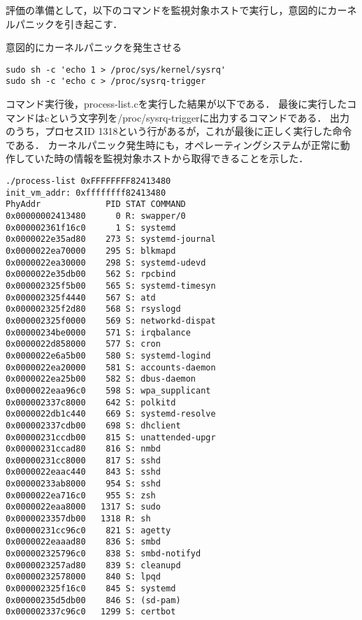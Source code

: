 評価の準備として，以下のコマンドを監視対象ホストで実行し，意図的にカーネルパニックを引き起こす．

\begin{itembox}[l]{意図的にカーネルパニックを発生させる}
    \begin{verbatim}
sudo sh -c 'echo 1 > /proc/sys/kernel/sysrq'
sudo sh -c 'echo c > /proc/sysrq-trigger
    \end{verbatim}
\end{itembox}

コマンド実行後，process-list.cを実行した結果が以下である．
最後に実行したコマンドはcという文字列を/proc/sysrq-triggerに出力するコマンドである．
出力のうち，プロセスID 1318という行があるが，これが最後に正しく実行した命令である．
カーネルパニック発生時にも，オペレーティングシステムが正常に動作していた時の情報を監視対象ホストから取得できることを示した．

\begin{itembox}[l]{1}
    \begin{verbatim}
./process-list 0xFFFFFFFF82413480
init_vm_addr: 0xffffffff82413480
PhyAddr             PID STAT COMMAND
0x00000002413480      0 R: swapper/0
0x000002361f16c0      1 S: systemd
0x0000022e35ad80    273 S: systemd-journal
0x0000022ea70000    295 S: blkmapd
0x0000022ea30000    298 S: systemd-udevd
0x0000022e35db00    562 S: rpcbind
0x000002325f5b00    565 S: systemd-timesyn
0x000002325f4440    567 S: atd
0x000002325f2d80    568 S: rsyslogd
0x000002325f0000    569 S: networkd-dispat
0x00000234be0000    571 S: irqbalance
0x0000022d858000    577 S: cron
0x0000022e6a5b00    580 S: systemd-logind
0x0000022ea20000    581 S: accounts-daemon
0x0000022ea25b00    582 S: dbus-daemon
0x0000022eaa96c0    598 S: wpa_supplicant
0x000002337c8000    642 S: polkitd
0x0000022db1c440    669 S: systemd-resolve
0x000002337cdb00    698 S: dhclient
0x00000231ccdb00    815 S: unattended-upgr
0x00000231ccad80    816 S: nmbd
0x00000231cc8000    817 S: sshd
0x0000022eaac440    843 S: sshd
0x00000233ab8000    954 S: sshd
0x0000022ea716c0    955 S: zsh
0x0000022eaa8000   1317 S: sudo
0x0000023357db00   1318 R: sh
0x00000231cc96c0    821 S: agetty
0x0000022eaaad80    836 S: smbd
0x000002325796c0    838 S: smbd-notifyd
0x0000023257ad80    839 S: cleanupd
0x00000232578000    840 S: lpqd
0x000002325f16c0    845 S: systemd
0x00000235d5db00    846 S: (sd-pam)
0x000002337c96c0   1299 S: certbot
    \end{verbatim}
\end{itembox}


